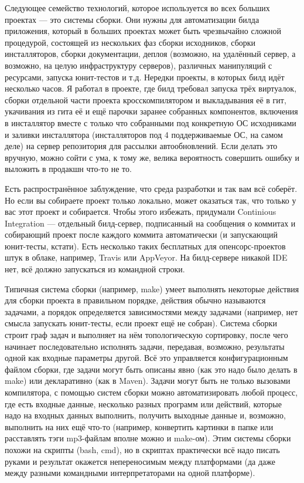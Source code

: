 \documentclass[a5paper]{article}
\begin{document}
Следующее семейство технологий, которое используется во всех больших проектах --- это системы сборки. Они нужны для автоматизации билда приложения, который в больших проектах может быть чрезвычайно сложной процедурой, состоящей из нескольких фаз сборки исходников, сборки инсталляторов, сборки документации, деплоя (возможно, на удалённый сервер, а возможно, на целую инфраструктуру серверов), различных манипуляций с ресурсами, запуска юнит-тестов и т.д. Нередки проекты, в которых билд идёт несколько часов. Я работал в проекте, где билд требовал запуска трёх виртуалок, сборки отдельной части проекта кросскомпилятором и выкладывания её в гит, укачивания из гита её и ещё парочки заранее собранных компонентов, включения в инсталлятор вместе с только что собранными под конкретную ОС исходниками и заливки инсталлятора (инсталляторов под 4 поддерживаемые ОС, на самом деле) на сервер репозитория для рассылки автообновлений. Если делать это вручную, можно сойти с ума, к тому же, велика вероятность совершить ошибку и выложить в продакшн что-то не то.

Есть распространённое заблуждение, что среда разработки и так вам всё соберёт. Но если вы собираете проект только локально, может оказаться так, что только у вас этот проект и собирается. Чтобы этого избежать, придумали Continious Integration --- отдельный билд-сервер, подписанный на сообщения о коммитах и собирающий проект после каждого коммита автоматически (и запускающий юнит-тесты, кстати). Есть несколько таких бесплатных для опенсорс-проектов штук в облаке, например, Travis или AppVeyor. На билд-сервере никакой IDE нет, всё должно запускаться из командной строки.

Типичная система сборки (например, make) умеет выполнять некоторые действия для сборки проекта в правильном порядке, действия обычно называются задачами, а порядок определяется зависимостями между задачами (например, нет смысла запускать юнит-тесты, если проект ещё не собран). Система сборки строит граф задач и выполняет на нём топологическую сортировку, после чего начинает последовательно исполнять задачи, передавая, возможно, результаты одной как входные параметры другой. Всё это управляется конфигурационным файлом сборки, где задачи могут быть описаны явно (как это надо было делать в make) или декларативно (как в Maven). Задачи могут быть не только вызовами компилятора, с помощью систем сборки можно автоматизировать любой процесс, где есть входные данные, несколько разных программ или действий, которые надо на входных данных выполнить, получить выходные данные и, возможно, выполнить на них ещё что-то (например, конвертить картинки в папке или расставлять тэги mp3-файлам вполне можно и make-ом). Этим системы сборки похожи на скрипты (bash, cmd), но в скриптах практически всё надо писать руками и результат окажется непереносимым между платформами (да даже между разными командными интерпретаторами на одной платформе).
\end{document}
